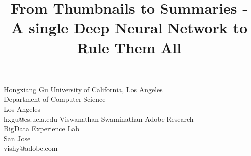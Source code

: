 \documentclass[5pt]{article}
\begin{document}
\sloppy

\def\x{{\mathbf x}}
\def\L{{\cal L}}


\title{From Thumbnails to Summaries - A single Deep Neural Network to Rule Them All}
%
%
%
\twoauthors
  {Hongxiang Gu}
	{University of California, Los Angeles\\
	Department of Computer Science\\
	Los Angeles\\
	hxgu@cs.ucla.edu}
  {Viswanathan Swaminathan}
	{Adobe Research \\
	BigData Experience Lab\\
	San Jose\\
        vishy@adobe.com}
%

\maketitle
\end{document}
